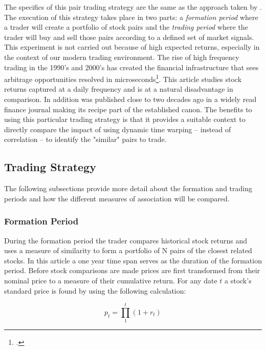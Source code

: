 \documentclass[12pt]{article}
\begin{document}
The specifics of this pair trading strategy are the same as the approach taken by \cite{Gatev_et_al_2006}. The execution of this strategy takes place in two parts: a \textit{formation period} where a trader will create a portfolio of stock pairs and the \textit{trading period} where the trader will buy and sell those pairs according to a defined set of market signals. This experiment is not carried out because of high expected returns, especially in the context of our modern trading environment. The rise of high frequency trading in the 1990's and 2000's has created the financial infrastructure that sees arbitrage opportunities resolved in microseconds\footcite[See][for a more detailed ]{Aquilina_et_al_2021}. This article studies stock returns captured at a daily frequency and is at a natural disadvantage in comparison. In addition \cite{Gatev_et_al_2006} was published close to two decades ago in a widely read finance journal making its recipe part of the established canon. The benefits to using this particular trading strategy is that it provides a suitable context to directly compare the impact of using dynamic time warping -- instead of correlation -- to identify the "similar" pairs to trade.

\subsection{Trading Strategy}

The following subsections provide more detail about the formation and trading periods and how the different measures of association will be compared.

\subsubsection{Formation Period}

During the formation period the trader compares historical stock returns and uses a measure of similarity to form a portfolio of N pairs of the closest related stocks. In this article a one year time span serves as the duration of the formation period. Before stock comparisons are made prices are first transformed from their nominal price to a measure of their cumulative return. For any date $t$ a stock's standard price is found by using the following calculation:

\begin{equation} \label{eq:standard_price}
    p_{t} = \prod_{1}^{t} (1 + r_{t})
\end{equation}
\end{document}
